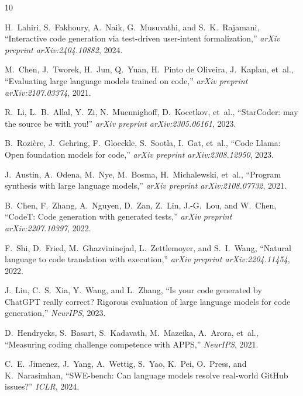 \documentclass[conference]{IEEEtran}
\begin{document}
\balance


\begin{thebibliography}{10}

H.~Lahiri, S.~Fakhoury, A.~Naik, G.~Musuvathi, and S.~K.~Rajamani,
``Interactive code generation via test-driven user-intent formalization,''
\textit{arXiv preprint arXiv:2404.10882}, 2024.

M.~Chen, J.~Tworek, H.~Jun, Q.~Yuan, H.~Pinto de Oliveira, J.~Kaplan, et~al.,
``Evaluating large language models trained on code,''
\textit{arXiv preprint arXiv:2107.03374}, 2021.

R.~Li, L.~B.~Allal, Y.~Zi, N.~Muennighoff, D.~Kocetkov, et~al.,
``StarCoder: may the source be with you!''
\textit{arXiv preprint arXiv:2305.06161}, 2023.

B.~Rozi\`{e}re, J.~Gehring, F.~Gloeckle, S.~Sootla, I.~Gat, et~al.,
``Code Llama: Open foundation models for code,''
\textit{arXiv preprint arXiv:2308.12950}, 2023.

J.~Austin, A.~Odena, M.~Nye, M.~Bosma, H.~Michalewski, et~al.,
``Program synthesis with large language models,''
\textit{arXiv preprint arXiv:2108.07732}, 2021.

B.~Chen, F.~Zhang, A.~Nguyen, D.~Zan, Z.~Lin, J.-G.~Lou, and W.~Chen,
``CodeT: Code generation with generated tests,''
\textit{arXiv preprint arXiv:2207.10397}, 2022.

F.~Shi, D.~Fried, M.~Ghazvininejad, L.~Zettlemoyer, and S.~I.~Wang,
``Natural language to code translation with execution,''
\textit{arXiv preprint arXiv:2204.11454}, 2022.

J.~Liu, C.~S.~Xia, Y.~Wang, and L.~Zhang,
``Is your code generated by ChatGPT really correct? Rigorous evaluation of large language models for code generation,''
\textit{NeurIPS}, 2023.

D.~Hendrycks, S.~Basart, S.~Kadavath, M.~Mazeika, A.~Arora, et~al.,
``Measuring coding challenge competence with APPS,''
\textit{NeurIPS}, 2021.

C.~E.~Jimenez, J.~Yang, A.~Wettig, S.~Yao, K.~Pei, O.~Press, and K.~Narasimhan,
``SWE-bench: Can language models resolve real-world GitHub issues?''
\textit{ICLR}, 2024.

\end{thebibliography}
\end{document}
